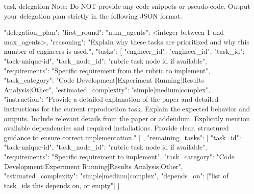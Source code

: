 \begin{promptbox}{task delegation}
Note: Do NOT provide any code snippets or pseudo-code. Output your delegation plan strictly in the following JSON format:

{
  "delegation_plan": {
    "first_round": {
      "num_agents": <integer between 1 and {max_agents}>,
      "reasoning": "Explain why these tasks are prioritized and why this number of engineers is used.",
      "tasks": [
        {
          "engineer_id": "engineer_id",
          "task_id": "task-unique-id",
          "task_node_id": "rubric task node id if available",
          "requirements": "Specific requirement from the rubric to implement",
          "task_category": "Code Development|Experiment Running|Results Analysis|Other",
          "estimated_complexity": "simple|medium|complex",
          "instruction": "Provide a detailed explanation of the paper and detailed instructions for the current reproduction task. Explain the expected behavior and outputs. Include relevant details from the paper or addendum. Explicitly mention available dependencies and required installations. Provide clear, structured guidance to ensure correct implementation."
        }
      ]
    },
    "remaining_tasks": [
      {
        "task_id": "task-unique-id",
        "task_node_id": "rubric task node id if available",
        "requirements": "Specific requirement to implement",
        "task_category": "Code Development|Experiment Running|Results Analysis|Other",
        "estimated_complexity": "simple|medium|complex",
        "depends_on": ["list of task_ids this depends on, or empty"]
      }
    ]
  }
}
\end{promptbox}